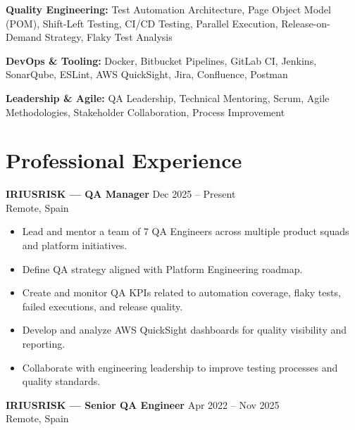 \documentclass[11pt,a4paper]{article}
\begin{document}
\vspace{0.2cm}

\textbf{Quality Engineering:}
Test Automation Architecture, Page Object Model (POM), Shift-Left Testing, CI/CD Testing, Parallel Execution, Release-on-Demand Strategy, Flaky Test Analysis

\vspace{0.2cm}

\textbf{DevOps \& Tooling:}
Docker, Bitbucket Pipelines, GitLab CI, Jenkins, SonarQube, ESLint, AWS QuickSight, Jira, Confluence, Postman

\vspace{0.2cm}

\textbf{Leadership \& Agile:}
QA Leadership, Technical Mentoring, Scrum, Agile Methodologies, Stakeholder Collaboration, Process Improvement


\section*{Professional Experience}

\textbf{IRIUSRISK — QA Manager} \hfill Dec 2025 -- Present \\
Remote, Spain

\begin{itemize}[leftmargin=*, itemsep=0.3em]
    \item Lead and mentor a team of 7 QA Engineers across multiple product squads and platform initiatives.
    \item Define QA strategy aligned with Platform Engineering roadmap.
    \item Create and monitor QA KPIs related to automation coverage, flaky tests, failed executions, and release quality.
    \item Develop and analyze AWS QuickSight dashboards for quality visibility and reporting.
    \item Collaborate with engineering leadership to improve testing processes and quality standards.
\end{itemize}

\vspace{0.3cm}

\newpage

\textbf{IRIUSRISK — Senior QA Engineer} \hfill Apr 2022 -- Nov 2025 \\
Remote, Spain
\end{document}
